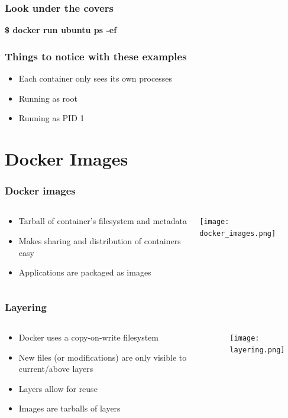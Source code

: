 \documentclass[aspectratio=169,11pt,hyperref={colorlinks=true}]{beamer}
\begin{document}
\begin{frame}
    \frametitle{Look under the covers}
    {\LARGE \textbf{\$ docker run ubuntu ps -ef}}
\end{frame}

\begin{frame}
    \frametitle{Things to notice with these examples}
    \begin{itemize}
        \item Each container only sees its own processes
        \item Running as root
        \item Running as PID 1
    \end{itemize}
\end{frame}


\section{Docker Images}
\begin{frame}
    \frametitle{Docker images}
    \begin{columns}[T]
        \begin{column}{.48\textwidth}
            \begin{itemize}
                \item Tarball of container's filesystem and metadata
                \item Makes sharing and distribution of containers easy
                \item Applications are packaged as images
            \end{itemize}
        \end{column}
        \begin{column}{.48\textwidth}
            \centering
            \texttt{[image: docker\_images.png]}
        \end{column}
    \end{columns}
\end{frame}

\begin{frame}
    \frametitle{Layering}
    \begin{columns}[T]
    \begin{column}{.48\textwidth}
        \begin{itemize}
            \item Docker uses a copy-on-write filesystem
            \item New files (or modifications) are only visible to current/above layers
            \item Layers allow for reuse
            \item Images are tarballs of layers
        \end{itemize}
    \end{column}
    \begin{column}{.48\textwidth}
        \centering
        \texttt{[image: layering.png]}
    \end{column}
    \end{columns}
\end{frame}
\end{document}
